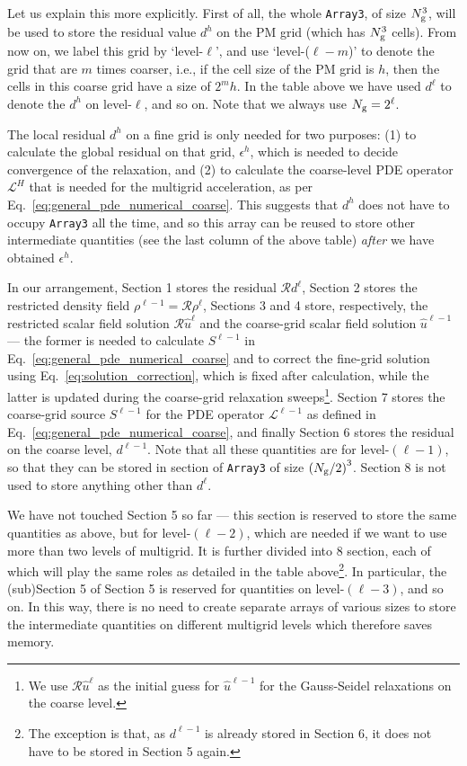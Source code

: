 Let us explain this more explicitly. First of all, the whole \texttt{Array3}, of size $N_{\rm g}^3$, will be used to store the residual value $d^h$ on the PM grid (which has $N_{\rm g}^3$ cells). From now on, we label this grid by `level-$\ell$', and use `level-($\ell-m$)' to denote the grid that are $m$ times coarser, i.e., if the cell size of the PM grid is $h$, then the cells in this coarse grid have a size of $2^mh$. 
In the table above we have used $d^\ell$ to denote the $d^h$ on level-$\ell$, and so on. 
Note that we always use $N_{\rm g}=2^\ell$.


The local residual $d^h$ on a fine grid is only needed for two purposes: (1) to calculate the global residual on that grid, $\epsilon^h$, which is needed to decide convergence of the relaxation, and (2) to calculate the coarse-level PDE operator $\mathcal{L}^H$ that is needed for the multigrid acceleration, as per Eq.~\eqref{eq:general_pde_numerical_coarse}. This suggests that $d^h$ does not have to occupy \texttt{Array3} all the time, and so this array can be reused to store other intermediate quantities (see the last column of the above table) \textit{after} we have obtained $\epsilon^h$. 

In our arrangement, Section 1 stores the residual $\mathcal{R}d^\ell$, Section 2 stores the restricted density field $\rho^{\ell-1}=\mathcal{R}\rho^\ell$, Sections 3 and 4 store, respectively, the restricted scalar field solution $\mathcal{R}\hat{u}^\ell$ and the coarse-grid scalar field solution $\hat{u}^{\ell-1}$ --- the former is needed to calculate $S^{\ell-1}$ in Eq.~\eqref{eq:general_pde_numerical_coarse} and to correct the fine-grid solution using Eq.~\eqref{eq:solution_correction}, which is fixed after calculation, while the latter is updated during the coarse-grid relaxation sweeps\footnote{We use $\mathcal{R}\hat{u}^\ell$ as the initial guess for $\hat{u}^{\ell-1}$ for the Gauss-Seidel relaxations on the coarse level.}. Section 7 stores the coarse-grid source $S^{\ell-1}$ for the PDE operator $\mathcal{L}^{\ell-1}$ as defined in Eq.~\eqref{eq:general_pde_numerical_coarse}, and finally Section 6 stores the residual on the coarse level, $d^{\ell-1}$. Note that all these quantities are for level-$(\ell-1)$, so that they can be stored in section of \texttt{Array3} of size $\left(N_{\rm g}/2\right)^3$. Section 8 is not used to store anything other than $d^\ell$. 

We have not touched Section 5 so far --- this section is reserved to store the same quantities as above, but for level-$(\ell-2)$, which are needed if we want to use more than two levels of multigrid. It is further divided into 8 section, each of which will play the same roles as detailed in the table above\footnote{The exception is that, as $d^{\ell-1}$ is already stored in Section 6, it does not have to be stored in Section 5 again.}. In particular, the (sub)Section 5 of Section 5 is reserved for quantities on level-$(\ell-3)$, and so on. In this way, there is no need to create separate arrays of various sizes to store the intermediate quantities on different multigrid levels which therefore saves memory. 

